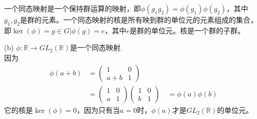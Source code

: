 \documentclass[a4paper, justified]{tufte-handout}
\begin{document}
\begin{solution}
	一个同态映射是一个保持群运算的映射，即$\phi(g_1g_2) = \phi(g_1)\phi(g_2)$，其中$g_1,g_2$是群的元素。一个同态映射的核是所有映到群的单位元的元素组成的集合，即$\ker(\phi) = {g \in G | \phi(g) = e}$，其中$e$是群的单位元。核是一个群的子群。


	(b) $\phi: \mathbb{R} \rightarrow G L_2(\mathbb{R})$是一个同态映射.\\
	因为
	$$
		\begin{aligned}
			\phi(a+b)                                                    & =
			\left(\begin{array}{ll} 1 &
             0        \\ a+b &
             1
			      \end{array}\right)                                                     \\  & =\left(\begin{array}{ll} 1 & 0 \\ a & 1 \end{array}\right)
			\left(\begin{array}{ll} 1 & 0 \\ b & 1 \end{array}\right) \  & =\phi(a) \phi(b)\end{aligned} $$ 它的核是$\ker(\phi) = {0}$，因为只有当$a=0$时，$\phi(a)$才是$GL_2(\mathbb{R})$的单位元。


\end{solution}
\end{document}
